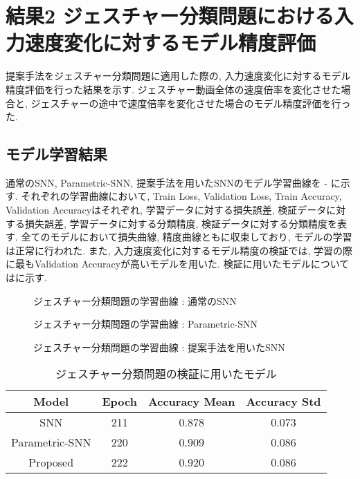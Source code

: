\section{結果2 ジェスチャー分類問題における入力速度変化に対するモデル精度評価}
提案手法をジェスチャー分類問題に適用した際の, 入力速度変化に対するモデル精度評価を行った結果を示す.
ジェスチャー動画全体の速度倍率を変化させた場合と, ジェスチャーの途中で速度倍率を変化させた場合のモデル精度評価を行った.

\subsection{モデル学習結果}
通常のSNN, Parametric-SNN, 提案手法を用いたSNNのモデル学習曲線を - に示す.
それぞれの学習曲線において, Train Loss, Validation Loss, Train Accuracy, Validation Accuracyはそれぞれ, 学習データに対する損失誤差, 検証データに対する損失誤差, 学習データに対する分類精度, 検証データに対する分類精度を表す.
全てのモデルにおいて損失曲線, 精度曲線ともに収束しており, モデルの学習は正常に行われた.
また, 入力速度変化に対するモデル精度の検証では, 学習の際に最もValidation Accuracyが高いモデルを用いた.
検証に用いたモデルについてはに示す.
\begin{figure}[htb]
    \centering
    
    \caption{ジェスチャー分類問題の学習曲線 : 通常のSNN}
    \label{fig:result2:1:snn}
\end{figure}
\begin{figure}[htb]
    \centering
    
    \caption{ジェスチャー分類問題の学習曲線 : Parametric-SNN}
    \label{fig:result2:1:parametric:snn}
\end{figure}
\begin{figure}[htb]
    \centering
    
    \caption{ジェスチャー分類問題の学習曲線 : 提案手法を用いたSNN}
    \label{fig:result2:1:proposed}
\end{figure}

\begin{table}[htb]
    \centering
    \caption{ジェスチャー分類問題の検証に用いたモデル}
    \label{tab:result2:model:parameter}
    \begin{tabular}{cccc}
        \hline
        \textbf{Model}& \textbf{Epoch} & \textbf{Accuracy Mean} & \textbf{Accuracy Std}\\
        \hline
        SNN &  211 & 0.878 & 0.073\\
        Parametric-SNN & 220 & 0.909 & 0.086\\
        Proposed & 222 & 0.920 & 0.086\\
        \hline
    \end{tabular}
\end{table}
\clearpage

